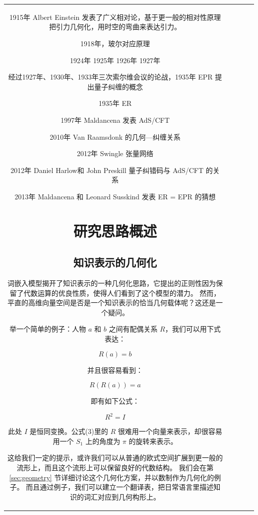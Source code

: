 \documentclass[a4paper,12pt]{article}
\begin{document}
\begin{table}[tbhp]
\begin{tabular}{|c|c|c|c|c|}
1915年 Albert Einstein 发表了广义相对论，基于更一般的相对性原理把引力几何化，用时空的弯曲来表达引力。

1918年，玻尔对应原理

1924年
1925年
1926年
1927年

经过1927年、1930年、1933年三次索尔维会议的论战，1935年 EPR 提出量子纠缠的概念

1935年 ER

1997年 Maldancena 发表 AdS/CFT

2010年 Van Raamsdonk 的几何—纠缠关系

2012年 Swingle 张量网络

2012年 Daniel Harlow和 John Preskill 量子纠错码与 AdS/CFT 的关系

2013年 Maldancena 和 Leonard Susskind 发表 ER = EPR 的猜想

\newpage

\section{研究思路概述}

\subsection{知识表示的几何化}

词嵌入模型揭开了知识表示的一种几何化思路，它提出的正则性因为保留了代数运算的优良性质，使得人们看到了这个模型的潜力。
然而，平直的高维向量空间是否是一个知识表示的恰当几何载体呢？这还是一个疑问。

举一个简单的例子：人物 $a$ 和 $b$ 之间有配偶关系 $R$，我们可以用下式表达：

\begin{equation}
R(a) = b
\end{equation}

并且很容易看到：

\begin{equation}
R(R(a)) = a
\end{equation}

即有如下公式：　

\begin{equation}
R^2 = I
\end{equation}

此处 $I$ 是恒同变换。公式(3)里的 $R$ 很难用一个向量来表示，却很容易用一个 $S_1$ 上的角度为 $\pi$ 的旋转来表示。

这给我们一定的提示，或许我们可以从普通的欧式空间扩展到更一般的流形上，而且这个流形上可以保留良好的代数结构。
我们会在第 \ref{sec:geometry} 节详细讨论这个几何化方案，并以数制作为几何化的例子。
而且通过例子，我们可以建立一个翻译表，把日常语言里描述知识的词汇对应到几何构形上。


\end{tabular}
\end{table}
\end{document}
